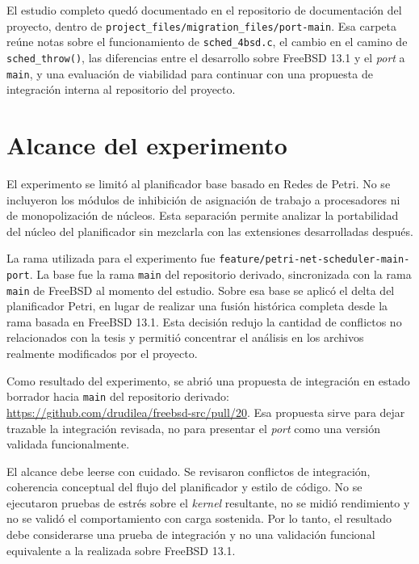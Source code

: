 El estudio completo quedó documentado en el repositorio de documentación del proyecto, dentro de \verb|project_files/migration_files/port-main|. Esa carpeta reúne notas sobre el funcionamiento de \verb|sched_4bsd.c|, el cambio en el camino de \verb|sched_throw()|, las diferencias entre el desarrollo sobre FreeBSD 13.1 y el \textit{port} a \texttt{main}, y una evaluación de viabilidad para continuar con una propuesta de integración interna al repositorio del proyecto.\par

\section{Alcance del experimento}

El experimento se limitó al planificador base basado en Redes de Petri. No se incluyeron los módulos de inhibición de asignación de trabajo a procesadores ni de monopolización de núcleos. Esta separación permite analizar la portabilidad del núcleo del planificador sin mezclarla con las extensiones desarrolladas después.\par

La rama utilizada para el experimento fue \verb|feature/petri-net-scheduler-main-port|. La base fue la rama \texttt{main} del repositorio derivado, sincronizada con la rama \texttt{main} de FreeBSD al momento del estudio. Sobre esa base se aplicó el delta del planificador Petri, en lugar de realizar una fusión histórica completa desde la rama basada en FreeBSD 13.1. Esta decisión redujo la cantidad de conflictos no relacionados con la tesis y permitió concentrar el análisis en los archivos realmente modificados por el proyecto.\par

Como resultado del experimento, se abrió una propuesta de integración en estado borrador hacia \texttt{main} del repositorio derivado: \url{https://github.com/drudilea/freebsd-src/pull/20}. Esa propuesta sirve para dejar trazable la integración revisada, no para presentar el \textit{port} como una versión validada funcionalmente.\par

El alcance debe leerse con cuidado. Se revisaron conflictos de integración, coherencia conceptual del flujo del planificador y estilo de código. No se ejecutaron pruebas de estrés sobre el \textit{kernel} resultante, no se midió rendimiento y no se validó el comportamiento con carga sostenida. Por lo tanto, el resultado debe considerarse una prueba de integración y no una validación funcional equivalente a la realizada sobre FreeBSD 13.1.\par

